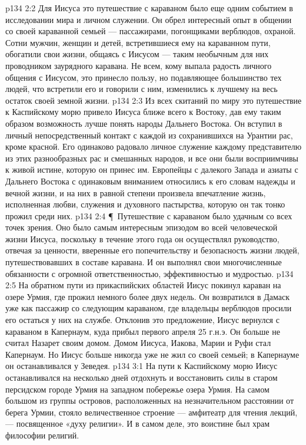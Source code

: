 \vs p134 2:2 Для Иисуса это путешествие с караваном было еще одним событием в исследовании мира и личном служении. Он обрел интересный опыт в общении со своей караванной семьей --- пассажирами, погонщиками верблюдов, охраной. Сотни мужчин, женщин и детей, встретившиеся ему на караванном пути, обогатили свои жизни, общаясь с Иисусом --- таким необычным для них проводником заурядного каравана. Не всем, кому выпала радость личного общения с Иисусом, это принесло пользу, но подавляющее большинство тех людей, что встретили его и говорили с ним, изменились к лучшему на весь остаток своей земной жизни.
\vs p134 2:3 Из всех скитаний по миру это путешествие к Каспийскому морю привело Иисуса ближе всего к Востоку, дав ему таким образом возможность лучше понять народы Дальнего Востока. Он вступил в личный непосредственный контакт с каждой из сохранившихся на Урантии рас, кроме красной. Его одинаково радовало личное служение каждому представителю из этих разнообразных рас и смешанных народов, и все они были восприимчивы к живой истине, которую он принес им. Европейцы с далекого Запада и азиаты с Дальнего Востока с одинаковым вниманием относились к его словам надежды и вечной жизни, и на них в равной степени произвела впечатление жизнь, исполненная любви, служения и духовного пастырства, которую он так тонко прожил среди них.
\vs p134 2:4 \P\ Путешествие с караваном было удачным со всех точек зрения. Оно было самым интересным эпизодом во всей человеческой жизни Иисуса, поскольку в течение этого года он осуществлял руководство, отвечая за ценности, вверенные его попечительству и безопасность жизни людей, путешествовавших в составе каравана. И он выполнял свои многочисленные обязанности с огромной ответственностью, эффективностью и мудростью.
\vs p134 2:5 На обратном пути из прикаспийских областей Иисус покинул караван на озере Урмия, где прожил немного более двух недель. Он возвратился в Дамаск уже как пассажир со следующим караваном, где владельцы верблюдов просили его остаться у них на службе. Отклонив это предложение, Иисус вернулся с караваном в Капернаум, куда прибыл первого апреля 25 г.н.э. Он больше не считал Назарет своим домом. Домом Иисуса, Иакова, Марии и Руфи стал Капернаум. Но Иисус больше никогда уже не жил со своей семьей; в Капернауме он останавливался у Зеведея.
\vs p134 3:1 На пути к Каспийскому морю Иисус останавливался на несколько дней отдохнуть и восстановить силы в старом персидском городе Урмия на западном побережье озера Урмия. На самом большом из группы островов, расположенных на незначительном расстоянии от берега Урмии, стояло величественное строение --- амфитеатр для чтения лекций, --- посвященное «духу религии». И в самом деле, это воистине был храм философии религий.
